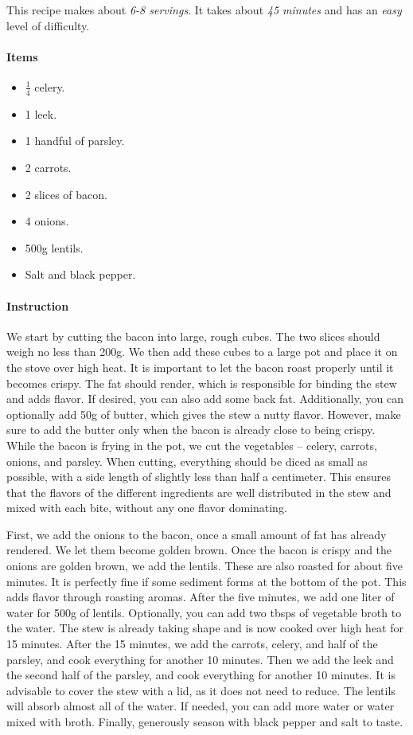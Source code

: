 This recipe makes about \emph{6-8 servings}. It takes about \emph{45 minutes} and has an \emph{easy} level of difficulty. 

\paragraph{Items}
\begin{itemize}[noitemsep]
	\item[\ding{182}] $\frac{1}{4}$ celery.
	\item[\ding{183}] 1 leek.
	\item[\ding{184}] 1 handful of parsley.
	\item[\ding{185}] 2 carrots.
	\item[\ding{186}] 2 slices of bacon.
	\item[\ding{187}] 4 onions.
	\item[\ding{188}] 500g lentils.
	\item[\ding{189}] Salt and black pepper.
\end{itemize}

\paragraph{Instruction} 
We start by cutting the bacon into large, rough cubes. The two slices should weigh no less than 200g. We then add these cubes to a large pot and place it on the stove over high heat. It is important to let the bacon roast properly until it becomes crispy. The fat should render, which is responsible for binding the stew and adds flavor. If desired, you can also add some back fat. Additionally, you can optionally add 50g of butter, which gives the stew a nutty flavor. However, make sure to add the butter only when the bacon is already close to being crispy. While the bacon is frying in the pot, we cut the vegetables -- celery, carrots, onions, and parsley. When cutting, everything should be diced as small as possible, with a side length of slightly less than half a centimeter. This ensures that the flavors of the different ingredients are well distributed in the stew and mixed with each bite, without any one flavor dominating.

First, we add the onions to the bacon, once a small amount of fat has already rendered. We let them become golden brown. Once the bacon is crispy and the onions are golden brown, we add the lentils. These are also roasted for about five minutes. It is perfectly fine if some sediment forms at the bottom of the pot. This adds flavor through roasting aromas. After the five minutes, we add one liter of water for 500g of lentils. Optionally, you can add two tbsps of vegetable broth to the water. The stew is already taking shape and is now cooked over high heat for 15 minutes. After the 15 minutes, we add the carrots, celery, and half of the parsley, and cook everything for another 10 minutes. Then we add the leek and the second half of the parsley, and cook everything for another 10 minutes. It is advisable to cover the stew with a lid, as it does not need to reduce. The lentils will absorb almost all of the water. If needed, you can add more water or water mixed with broth. Finally, generously season with black pepper and salt to taste.


